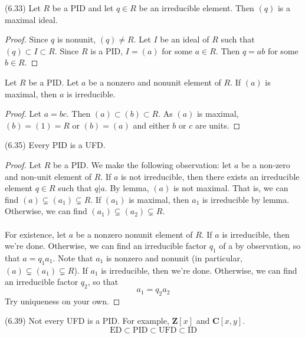 \vspace{2ex}
\begin{prop}
(6.33) Let $R$ be a PID and let $q\in R$ be an irreducible element. Then $(q)$ is a maximal ideal.
\end{prop}
\vspace{2ex}
\begin{proof}
Since $q$ is nonunit, $(q)\ne R$. Let $I$ be an ideal of $R$ such that $(q)\subset I\subset R$. Since $R$ is a PID, $I=(a)$ for some $a\in R$. Then $q=ab$ for some $b\in R$. 
\end{proof}
\vspace{2ex}
\begin{lem}
Let $R$ be a PID. Let $a$ be a nonzero and nonunit element of $R$. If $(a)$ is maximal, then $a$ is irreducible. 
\end{lem}
\vspace{2ex}
\begin{proof}
Let $a=bc$. Then $(a)\subset (b)\subset R$. As $(a)$ is maximal, $(b)=(1)=R$ or $(b)=(a)$ and either $b$ or $c$ are units. 
\end{proof}
\vspace{2ex}
\begin{thm}
(6.35) Every PID is a UFD.
\end{thm}
\vspace{2ex}
\begin{proof}
Let $R$ be a PID. We make the following observation: let $a$ be a non-zero and non-unit element of $R$. If $a$ is not irreducible, then there exists an irreducible element $q\in R$ such that $q|a$. By lemma, $(a)$ is not maximal. That is, we can find $(a)\subsetneq (a_{1})\subsetneq R$. If $(a_1)$ is maximal, then $a_1$  is irreducible by lemma. Otherwise, we can find $(a_1)\subsetneq (a_2)\subsetneq R $. 
\\\\
For existence, let $a$ be a nonzero nonunit element of $R$. If $a$ is irreducible, then we're done. Otherwise, we can find an irreducible factor $q_1$ of a by observation, so that $a=q_1a_1$. Note that $a_1$ is nonzero and nonunit (in particular, $(a)\subsetneq (a_1)\subsetneq R$). If $a_1$ is irreducible, then we're done. Otherwise, we can find an irreducible factor $q_2$, so that
\[a_1=q_2a_2\]
Try uniqueness on your own.
\end{proof}
\vspace{2ex}
\begin{rmk}
(6.39) Not every UFD is a PID. For example, ${\bm Z}[x]$ and ${\bm C}[x,y]$.
\[\mathrm{ED}\subset \mathrm{PID}\subset \mathrm{UFD}\subset \mathrm{ID}\]
\end{rmk}
\vspace{2ex}

